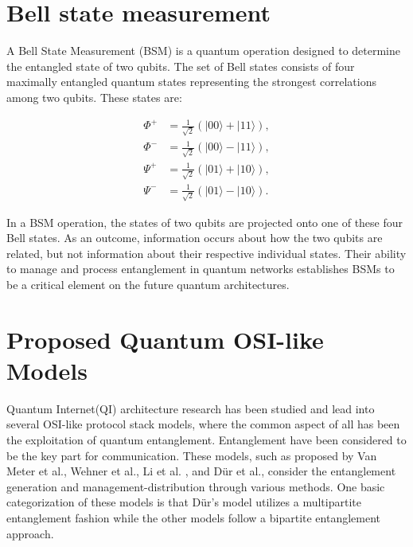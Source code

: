 \documentclass[12pt,a4paper] {report}
\begin{document}
		\section{Bell state measurement}

		A Bell State Measurement (BSM) is a quantum operation designed to determine
		the entangled state of two qubits. The set of Bell states consists of four 
		maximally entangled quantum states representing the strongest correlations
		among two qubits. These states are:

			\begin{align*}
			    \Phi^+ &= \frac{1}{\sqrt{2}} (|00\rangle + |11\rangle), \\
			    \Phi^- &= \frac{1}{\sqrt{2}} (|00\rangle - |11\rangle), \\
			    \Psi^+ &= \frac{1}{\sqrt{2}} (|01\rangle + |10\rangle), \\
			    \Psi^- &= \frac{1}{\sqrt{2}} (|01\rangle - |10\rangle).
			\end{align*}

		In a BSM operation, the states of two qubits are projected onto one of these four Bell states. 
		As an outcome, information occurs about how the two qubits are related, but not information
		about their respective individual states. Their ability to manage and process entanglement
		in quantum networks establishes BSMs to be a critical element on the future quantum architectures. 


		\section{Proposed Quantum OSI-like Models}
		
		Quantum Internet(QI) architecture research has been studied and lead into several OSI-like protocol 
		stack models, where the common aspect of all has been the exploitation of
		quantum entanglement. Entanglement have been considered to be the key part for communication. 
		These models, such as proposed by Van Meter et al.\cite{quantum-arch}, 
		Wehner et al.\cite{wehner-arch}, Li et al. \cite{li-arch}, and Dür et al.\cite{dur-multipartite}, 
		consider the entanglement generation and management-distribution through various methods.
		One basic categorization of these models is that Dür's model utilizes a multipartite entanglement fashion
		while the other models follow a bipartite entanglement approach.
		
\end{document}
